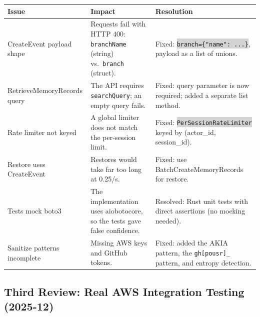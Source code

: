 \documentclass[11pt,letterpaper]{article}
\renewcommand{\arraystretch}{1.4}
\newcommand{\code}[1]{\texttt{\small\colorbox{lightgray}{#1}}}
\begin{document}
\begin{center}
\small
\renewcommand{\arraystretch}{1.35}
\begin{tabularx}{\textwidth}{>{\raggedright\arraybackslash}p{3.2cm} Y Y}
\textbf{\color{warningamber}Issue} & \textbf{\color{warningamber}Impact} & \textbf{\color{warningamber}Resolution} \\
\midrule
{}
CreateEvent payload shape & Requests fail with HTTP 400: \texttt{branchName} (string) vs.\ \texttt{branch} (struct). & Fixed: \code{branch=\{"name": ...\}}, payload as a list of unions. \\
RetrieveMemory\-Records query & The API requires \texttt{searchQuery}; an empty query fails. & Fixed: query parameter is now required; added a separate list method. \\
Rate limiter not keyed & A global limiter does not match the per-session limit. & Fixed: \code{PerSessionRateLimiter} keyed by (actor\_id, session\_id). \\
Restore uses CreateEvent & Restores would take far too long at 0.25/s. & Fixed: use BatchCreateMemoryRecords for restore. \\
Tests mock boto3 & The implementation uses aiobotocore, so the tests gave false confidence. & Resolved: Rust unit tests with direct assertions (no mocking needed). \\
Sanitize patterns incomplete & Missing AWS keys and GitHub tokens. & Fixed: added the AKIA pattern, the \texttt{gh[pousr]\_} pattern, and entropy detection. \\
\bottomrule
\end{tabularx}
\end{center}

\subsection*{Third Review: Real AWS Integration Testing (2025-12)}
\end{document}
